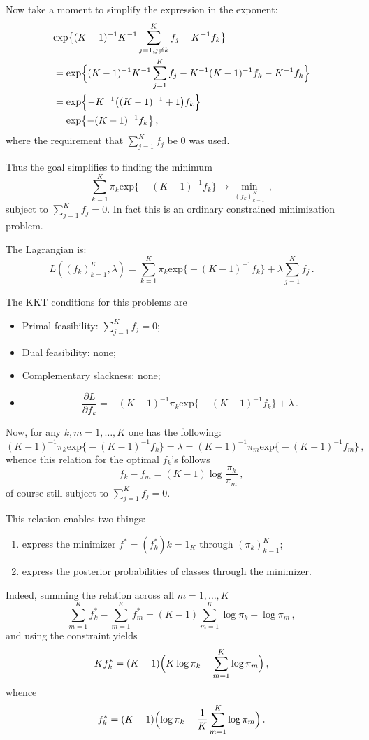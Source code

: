 \documentclass[a4paper]{article}
\begin{document}
Now take a moment to simplify the expression in the exponent:
\begin{align*}
	&\text{exp}\bigl\{ (K-1)^{-1}K^{-1} \sum_{j=1,j\neq k}^K f_j - K^{-1} f_k \bigr\}\\
	&= \text{exp}\Bigl\{ (K-1)^{-1}K^{-1} \sum_{j=1}^K f_j - K^{-1} (K-1)^{-1} f_k - K^{-1} f_k \Bigr\}\\
	&= \text{exp}\Bigl\{ - K^{-1}\bigl( (K-1)^{-1} + 1 \bigr) f_k \Bigr\}\\
	&= \text{exp}\bigl\{ - (K-1)^{-1} f_k \bigr\}\,,
\end{align*}
where the requirement that $\sum_{j=1}^K f_j$ be $0$ was used.

Thus the goal simplifies to finding the minimum
\[ \sum_{k=1}^K \pi_k \text{exp}\bigl\{ -(K-1)^{-1} f_k \bigr\} \to \min_{(f_k)_{k=1}^K} \,, \]
subject to $\sum_{j=1}^K f_j = 0$. In fact this is an ordinary constrained minimization problem.

The Lagrangian is:
\[
L((f_k)_{k=1}^K, \lambda)
= \sum_{k=1}^K \pi_k \text{exp}\bigl\{ -(K-1)^{-1} f_k \bigr\} + \lambda \sum_{j=1}^K f_j\,.
\]

The KKT conditions for this problems are \begin{itemize}
	\item Primal feasibility: $\sum_{j=1}^K f_j = 0$;
	\item Dual feasibility: none;
	\item Complementary slackness: none;
	\item
	\[
	\frac{\partial L}{\partial f_k}
		= -(K-1)^{-1} \pi_k \text{exp}\bigl\{ -(K-1)^{-1} f_k \bigr\} + \lambda \,.
	\]
\end{itemize}
Now, for any $k,m=1,\ldots,K$ one has the following:
\[
(K-1)^{-1} \pi_k \text{exp}\bigl\{ -(K-1)^{-1} f_k \bigr\}
= \lambda
= (K-1)^{-1} \pi_m \text{exp}\bigl\{ -(K-1)^{-1} f_m \bigr\}\,,
\]
whence this relation for the optimal $f_k$'s follows
\[ f_k - f_m = (K-1)\log\frac{\pi_k}{\pi_m} \,, \]
of course still subject to $\sum_{j=1}^K f_j = 0$.

This relation enables two things: \begin{enumerate}
	\item express the minimizer $f^* = (f^*_k){k=1}_K$ through $(\pi_k)_{k=1}^K$;
	\item express the posterior probabilities of classes through the minimizer.
\end{enumerate}
Indeed, summing the relation across all $m=1,\ldots,K$ 
\[ \sum_{m=1}^K f^*_k - \sum_{m=1}^K f^*_m = (K-1)\sum_{m=1}^K \log \pi_k - \log \pi_m\,, \]
and using the constraint yields
\[ K f^*_k = (K-1) \Bigl( K \log \pi_k - \sum_{m=1}^K \log \pi_m \Bigr)\,, \]
whence
\[ f^*_k = (K-1) \Bigl( \log \pi_k - \frac{1}{K}\sum_{m=1}^K \log \pi_m \Bigr)\,. \]
\end{document}
